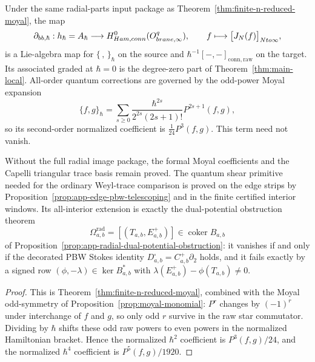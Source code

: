 \documentclass[11pt]{memoir}
\begin{document}
\begin{cor}\label{cor:degree-zero-quantum-upgrade}
  Under the same radial-parts input package as
  Theorem~\ref{thm:finite-n-reduced-moyal}, the map
  $$\partial_{bb,\hbar}:
    h_\hbar=A_\hbar\longrightarrow
    H^0_{Ham,conn}(O^{q}_{brane,\infty}),
    \qquad f\longmapsto
      \bigl[J_N(f)\bigr]_{Nto\infty},$$
  is a Lie-algebra map for $\{\,,\,\}_\hbar$ on the source and
  $\hbar^{-1}[-,-]_{\mathrm{conn,raw}}$ on the target. Its associated
  graded at $\hbar=0$ is the degree-zero part of
  Theorem~\ref{thm:main-local}. All-order quantum corrections are
  governed by the odd-power Moyal expansion
  $$\{f,g\}_\hbar=
    \sum_{s\geq0}\frac{\hbar^{2s}}{2^{2s}(2s+1)!}P^{2s+1}(f,g),$$
  so its second-order normalized coefficient is
  \(\frac1{24}P^3(f,g)\).  This term need not vanish.

  Without the full radial image package, the formal Moyal coefficients
  and the Capelli triangular trace basis remain proved.  The quantum
  shear primitive needed for the ordinary Weyl-trace comparison is
  proved on the edge strips by
  Proposition~\ref{prop:app-edge-pbw-telescoping} and in the finite
  certified interior windows.  Its all-interior extension is exactly the
  dual-potential obstruction theorem
  \[
    \Omega^{\mathrm{rad}}_{a,b}
      =
      [(T_{a,b},E^+_{a,b})]\in\operatorname{coker}B_{a,b}
  \]
  of Proposition~\ref{prop:app-radial-dual-potential-obstruction}:
  it vanishes if and only if the decorated PBW Stokes identity
  \(D^\square_{a,b}=C^+_{a,b}\partial_2\) holds, and it fails exactly by
  a signed row
  \((\phi,-\lambda)\in\ker B_{a,b}^*\) with
  \(\lambda(E^+_{a,b})-\phi(T_{a,b})\ne0\).
\end{cor}

\begin{proof}
  This is Theorem~\ref{thm:finite-n-reduced-moyal}, combined with the
  Moyal odd-symmetry of Proposition~\ref{prop:moyal-monomial}: $P^r$
  changes by $(-1)^r$ under interchange of $f$ and $g$, so only odd $r$
  survive in the raw star commutator. Dividing by \(\hbar\) shifts
  these odd raw powers to even powers in the normalized Hamiltonian
  bracket. Hence the normalized \(\hbar^2\) coefficient is
  \(P^3(f,g)/24\), and the normalized \(\hbar^4\) coefficient is
  \(P^5(f,g)/1920\).
\end{proof}
\end{document}
